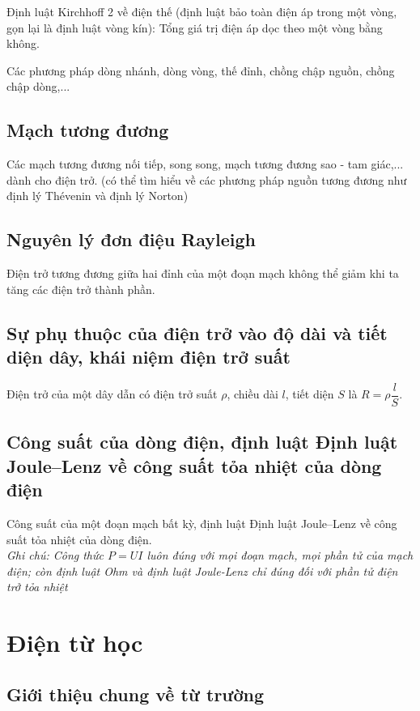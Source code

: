 \documentclass{article}
\begin{document}
\begin{multicols}{2}
\noindent Định luật Kirchhoff 2 về điện thế (định luật bảo toàn điện áp trong một vòng, gọn lại là định luật vòng kín): Tổng giá trị điện áp dọc theo một vòng bằng không.

\noindent Các phương pháp dòng nhánh, dòng vòng, thế đỉnh, chồng chập nguồn, chồng chập dòng,...

\subsection{Mạch tương đương}

Các mạch tương đương nối tiếp, song song, mạch tương đương sao - tam giác,... dành cho điện trở. (có thể tìm hiểu về các phương pháp nguồn tương đương như định lý Thévenin và định lý Norton)

\subsection{Nguyên lý đơn điệu Rayleigh}

Điện trở tương đương giữa hai đỉnh của một đoạn mạch không thể giảm khi ta tăng các điện trở thành phần.

\subsection{Sự phụ thuộc của điện trở vào độ dài và tiết diện dây, khái niệm điện trở suất}

Điện trở của một dây dẫn có điện trở suất $\rho$, chiều dài $l$, tiết diện $S$ là $R=\rho\dfrac{l}{S}$.

\subsection{Công suất của dòng điện, định luật Định luật Joule–Lenz về công suất tỏa nhiệt của dòng điện}

Công suất của một đoạn mạch bất kỳ, định luật Định luật Joule–Lenz về công suất tỏa nhiệt của dòng điện. \\
\textit{Ghi chú: Công thức $P=UI$ luôn đúng với mọi đoạn mạch, mọi phần tử của mạch điện; còn định luật Ohm và định luật Joule-Lenz chỉ đúng đối với phần tử điện trở tỏa nhiệt}

\section{Điện từ học}

\subsection{Giới thiệu chung về từ trường}


\end{multicols}
\end{document}
